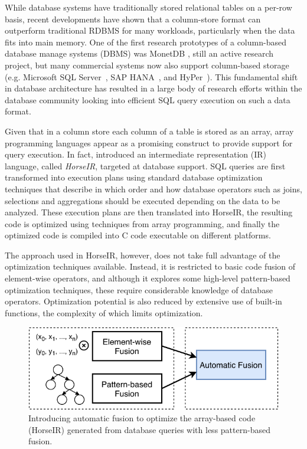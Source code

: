 While database systems have traditionally stored relational tables on a per-row
basis, recent developments have shown that a column-store format can outperform
traditional RDBMS for many workloads, particularly when the data fits into
main memory.
One of the first research prototypes of a column-based database manage systems
(DBMS) was MonetDB \cite{IdreosS2012}, still an active research project, but
many commercial systems now also support column-based storage (e.g.
Microsoft SQL Server~\cite{msqlserver},
SAP HANA~\cite{FarberF2012}, and
HyPer~\cite{Neumann2011:HyPer}).
This fundamental shift in database architecture has resulted in a large body of
research efforts within the database community looking into efficient SQL query
execution on such a data format.

Given that in a column store each column of a table is stored as an array,
array programming languages appear as a promising construct to provide support
for query execution. In fact, \OldPaperAuthor introduced an intermediate
representation (IR) language, called \textit{HorseIR}, targeted at database
support.  SQL queries are first transformed into execution plans using
standard database optimization techniques that describe in which order and
how database operators such as joins, selections and aggregations should be
executed depending on the data to be analyzed. These execution plans are
then translated into HorseIR, the resulting code is optimized using
techniques from array programming, and finally the optimized code is
compiled into C code executable on different platforms.

The approach used in HorseIR, however, does not take full advantage of the
optimization techniques available. Instead, it is restricted to basic code
fusion of element-wise operators, and although it explores some high-level
pattern-based optimization techniques, these require considerable knowledge of
database operators.  Optimization potential is also reduced by extensive use of
built-in functions, the complexity of which limits optimization.

\begin{figure}[htbp]
\centering
\includegraphics[width=.95\columnwidth]{./src/figure/basic-idea.pdf}
\caption{Introducing automatic fusion to optimize the array-based code
(HorseIR) generated from database queries with less pattern-based fusion.}
\label{fig:fusion_idea}
\end{figure}

